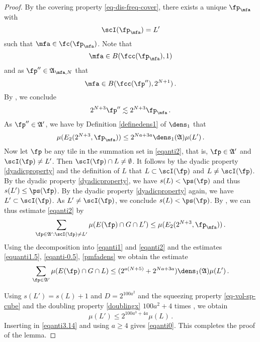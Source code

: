 \begin{proof}
By the covering property \eqref{eq-dis-freq-cover}, there exists a unique $\fp_{\mfa}$ with
\begin{equation*}
    \scI(\fp_{\mfa})=L'
\end{equation*}
such that $\mfa\in \fc(\fp_{\mfa})$.
Note that
\begin{equation}
    \mfa\in B(\fcc(\fp_{\mfa}), 1)
\end{equation}
and as $\fp'' \in \mathfrak{A}_{\mfa,N}$ that
\begin{equation}
    \mfa \in B(\fcc(\fp''), 2^{N+1})\, .
\end{equation}
By , we conclude
\begin{equation}
    2^{N+3}\fp'' \lesssim 2^{N+3}\fp_{\mfa} \, .
\end{equation}
As $\fp''\in \mathfrak{A}'$, we have by Definition
\eqref{definedens1} of $\dens_1$ that
\begin{equation}\label{pmfadens}
   \mu(E_2(2^{N+3}, \fp_{\mfa}))\le 2^{Na+3a}\dens_1(\mathfrak{A}) {\mu(L')}\, .
\end{equation}
Now let $\fp$ be any tile in the summation set in \eqref{eqanti2}, that is, $\fp\in \mathfrak{A}'$ and $\scI(\fp)\neq L'$.
Then $\scI(\fp)\cap L\neq \emptyset$. It follows by the dyadic property \eqref{dyadicproperty}
and the definition of $L$ that
$L\subset \scI(\fp)$ and $L\neq \scI(\fp)$. By the dyadic property \eqref{dyadicproperty}, we have
$s(L)<\ps(\fp)$ and thus $s(L')\le \ps(\fp)$. By the dyadic property
   \eqref{dyadicproperty} again, we have $L'\subset \scI(\fp)$.
As $L'\neq \scI(\fp)$, we conclude $s(L)<\ps(\fp)$.
By , we can thus estimate \eqref{eqanti2} by
\begin{equation}\label{eqanti0.5}
    \sum_{\fp\in\mathfrak{A}':\scI(\fp)\neq L'}\mu(E(\fp)\cap G\cap L')
    \le \mu (E_2(2^{N+3},\fp_{\mfa}))\, .
\end{equation}
Using the decomposition
into \eqref{eqanti1} and
\eqref{eqanti2} and the estimates
\eqref{equanti1.5},
\eqref{eqanti-0.5},
\eqref{pmfadens} we obtain the estimate
\begin{equation}\label{eqanti3.14}
\sum_{\fp\in\mathfrak{A}'}\mu(E(\fp)\cap G \cap L)
    \le (2^{a(N+5)}+2^{Na+3a})\dens_1(\mathfrak{A})\mu(L')\,.
\end{equation}

Using $s(L')=s(L)+1$ and $D=2^{100a^2}$ and the
squeezing property \eqref{eq-vol-sp-cube}
and the doubling property \eqref{doublingx} $100a^2+4$ times , we obtain
\begin{equation}
    \mu(L')\le 2^{100a^3+4a}\mu(L)\, .
\end{equation}
Inserting in \eqref{eqanti3.14} and using $a\ge 4$ gives \eqref{eqanti0}.
This completes the proof of the lemma.
\end{proof}



